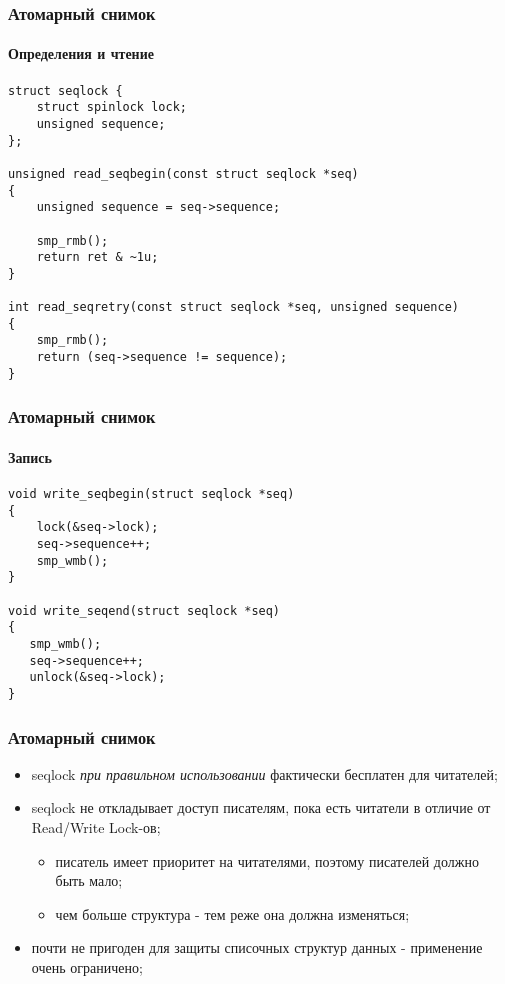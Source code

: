 \begin{frame}[fragile]
\frametitle{Атомарный снимок}
\framesubtitle{Определения и чтение}

\begin{lstlisting}
struct seqlock {
    struct spinlock lock;
    unsigned sequence;
};

unsigned read_seqbegin(const struct seqlock *seq)
{
    unsigned sequence = seq->sequence;

    smp_rmb();
    return ret & ~1u;
}

int read_seqretry(const struct seqlock *seq, unsigned sequence)
{
    smp_rmb();
    return (seq->sequence != sequence);
}
\end{lstlisting}
\end{frame}

\begin{frame}[fragile]
\frametitle{Атомарный снимок}
\framesubtitle{Запись}

\begin{lstlisting}
void write_seqbegin(struct seqlock *seq)
{
    lock(&seq->lock);
    seq->sequence++;
    smp_wmb();
}

void write_seqend(struct seqlock *seq)
{
   smp_wmb();
   seq->sequence++;
   unlock(&seq->lock);
}
\end{lstlisting}
\end{frame}

\begin{frame}
\frametitle{Атомарный снимок}

\begin{itemize}
  \item seqlock \emph{при правильном использовании} фактически бесплатен для
        читателей;
  \item seqlock не откладывает доступ писателям, пока есть читатели в отличие
        от Read/Write Lock-ов;
        \begin{itemize}
          \item писатель имеет приоритет на читателями, поэтому писателей
                должно быть мало;
          \item чем больше структура - тем реже она должна изменяться;
        \end{itemize}
  \item почти не пригоден для защиты списочных структур данных - применение
        очень ограничено;
\end{itemize}
\end{frame}
